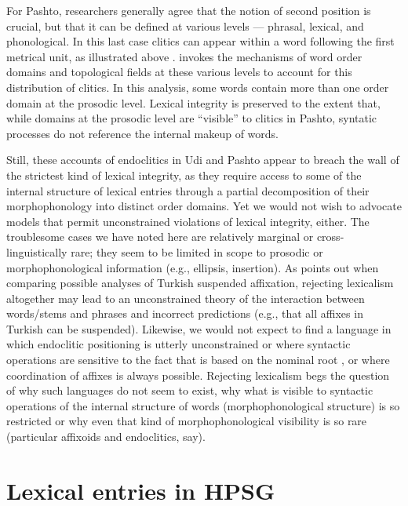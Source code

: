 \documentclass[output=paper]{langsci/langscibook}
\begin{document}
For Pashto, researchers generally agree that the notion of second position is crucial, but that it can be defined at various levels --- phrasal, lexical, and phonological. In this last case clitics can appear within a word following the first metrical unit, as illustrated above . \citet{Dost2007} invokes the mechanisms of word order domains \citep{Reape1994} and topological fields \citep{Kathol1999} at these various levels to account for this distribution of clitics. In this analysis, some words contain more than one order domain at the prosodic level. Lexical integrity is preserved to the extent that, while domains at the prosodic level are ``visible'' to clitics in Pashto, syntatic processes do not reference the internal makeup of words.

Still, these accounts of endoclitics in Udi and Pashto appear to breach the wall of the strictest kind of lexical integrity, as they require access to some of the internal structure of lexical entries through a partial decomposition of their morphophonology into distinct order domains. Yet we would not wish to advocate models that permit unconstrained violations of lexical integrity, either. The troublesome cases we have noted here are relatively marginal or cross-linguistically rare; they seem to be limited in scope to prosodic or morphophonological information (e.g., ellipsis, insertion). As \citet{Broadwell2008} points out when comparing possible analyses of Turkish suspended affixation, rejecting lexicalism altogether may lead to an unconstrained theory of the interaction between words/stems and phrases and incorrect predictions (e.g., that all affixes in Turkish can be suspended). Likewise, we would not expect to find a language in which endoclitic positioning is utterly unconstrained or where syntactic operations are sensitive to the fact that  is based on the nominal root , or where coordination of affixes is always possible. Rejecting lexicalism begs the question of why such languages do not seem to exist, why what is visible to syntactic operations of the internal structure of words (morphophonological structure) is so restricted or why even that kind of morphophonological visibility is so rare (particular affixoids and endoclitics, say).


\section{Lexical entries in HPSG}
\end{document}
